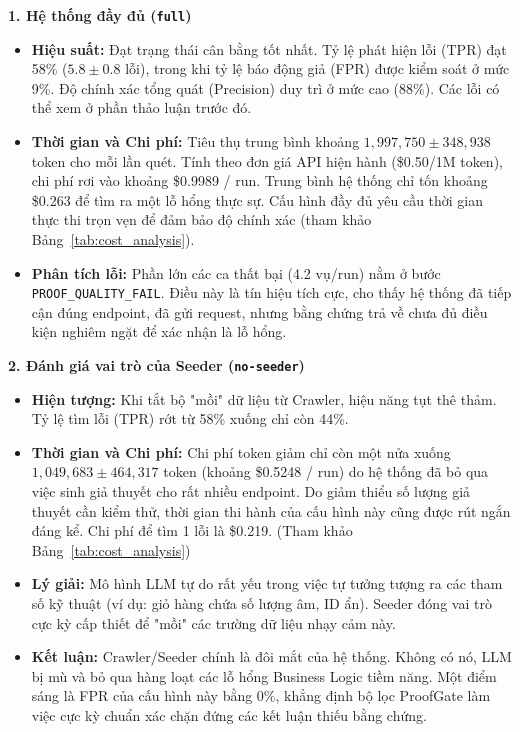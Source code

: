 \textbf{1. Hệ thống đầy đủ (\texttt{full})}
\begin{itemize}
    \item \textbf{Hiệu suất:} Đạt trạng thái cân bằng tốt nhất. Tỷ lệ phát hiện lỗi (TPR) đạt 58\% ($5.8 \pm 0.8$ lỗi), trong khi tỷ lệ báo động giả (FPR) được kiểm soát ở mức 9\%. Độ chính xác tổng quát (Precision) duy trì ở mức cao (88\%). Các lỗi có thể xem ở phần thảo luận trước đó.
    \item \textbf{Thời gian và Chi phí:} Tiêu thụ trung bình khoảng $1,997,750 \pm 348,938$ token cho mỗi lần quét. Tính theo đơn giá API hiện hành (\$0.50/1M token), chi phí rơi vào khoảng \$0.9989 / run. Trung bình hệ thống chỉ tốn khoảng \$0.263 để tìm ra một lỗ hổng thực sự. Cấu hình đầy đủ yêu cầu thời gian thực thi trọn vẹn để đảm bảo độ chính xác (tham khảo Bảng~\ref{tab:cost_analysis}).
    \item \textbf{Phân tích lỗi:} Phần lớn các ca thất bại (4.2 vụ/run) nằm ở bước \texttt{PROOF\_QUALITY\_FAIL}. Điều này là tín hiệu tích cực, cho thấy hệ thống đã tiếp cận đúng endpoint, đã gửi request, nhưng bằng chứng trả về chưa đủ điều kiện nghiêm ngặt để xác nhận là lỗ hổng.
\end{itemize}

\textbf{2. Đánh giá vai trò của Seeder (\texttt{no-seeder})}
\begin{itemize}
    \item \textbf{Hiện tượng:} Khi tắt bộ "mồi" dữ liệu từ Crawler, hiệu năng tụt thê thảm. Tỷ lệ tìm lỗi (TPR) rớt từ 58\% xuống chỉ còn 44\%.
    \item \textbf{Thời gian và Chi phí:} Chi phí token giảm chỉ còn một nửa xuống $1,049,683 \pm 464,317$ token (khoảng \$0.5248 / run) do hệ thống đã bỏ qua việc sinh giả thuyết cho rất nhiều endpoint. Do giảm thiểu số lượng giả thuyết cần kiểm thử, thời gian thi hành của cấu hình này cũng được rút ngắn đáng kể. Chi phí để tìm 1 lỗi là \$0.219. (Tham khảo Bảng~\ref{tab:cost_analysis})
    \item \textbf{Lý giải:} Mô hình LLM tự do rất yếu trong việc tự tưởng tượng ra các tham số kỹ thuật (ví dụ: giỏ hàng chứa số lượng âm, ID ẩn). Seeder đóng vai trò cực kỳ cấp thiết để "mồi" các trường dữ liệu nhạy cảm này. 
    \item \textbf{Kết luận:} Crawler/Seeder chính là đôi mắt của hệ thống. Không có nó, LLM bị mù và bỏ qua hàng loạt các lỗ hổng Business Logic tiềm năng. Một điểm sáng là FPR của cấu hình này bằng 0\%, khẳng định bộ lọc ProofGate làm việc cực kỳ chuẩn xác chặn đứng các kết luận thiếu bằng chứng.
\end{itemize}

